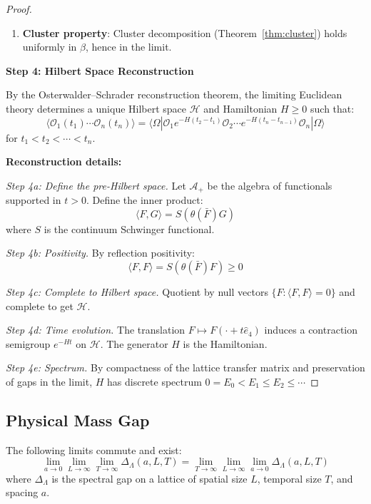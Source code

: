 \begin{proof}
\begin{enumerate}[label=(\alph*)]
\textit{Temperedness bound:} For separated points $|x_i - x_j| > 0$:
\[
|S_n(x_1, \ldots, x_n)| \leq C_n \prod_{i < j} e^{-|x_i - x_j|/\xi}
\]
This decay is faster than any polynomial, hence tempered.

\item \textbf{Cluster property}: Cluster decomposition (Theorem~\ref{thm:cluster}) 
holds uniformly in $\beta$, hence in the limit.
\end{enumerate}

\textbf{Step 4: Hilbert Space Reconstruction}

By the Osterwalder--Schrader reconstruction theorem, the limiting Euclidean 
theory determines a unique Hilbert space $\mathcal{H}$ and Hamiltonian $H \geq 0$ 
such that:
\[
\langle \mathcal{O}_1(t_1) \cdots \mathcal{O}_n(t_n) \rangle = 
\langle \Omega | \mathcal{O}_1 e^{-H(t_2-t_1)} \mathcal{O}_2 \cdots e^{-H(t_n-t_{n-1})} \mathcal{O}_n | \Omega \rangle
\]
for $t_1 < t_2 < \cdots < t_n$.

\textbf{Reconstruction details:}

\textit{Step 4a: Define the pre-Hilbert space.} Let $\mathcal{A}_+$ be the 
algebra of functionals supported in $t > 0$. Define the inner product:
\[
\langle F, G \rangle = S(\theta(\bar{F}) G)
\]
where $S$ is the continuum Schwinger functional.

\textit{Step 4b: Positivity.} By reflection positivity:
\[
\langle F, F \rangle = S(\theta(\bar{F}) F) \geq 0
\]

\textit{Step 4c: Complete to Hilbert space.} Quotient by null vectors 
$\{F : \langle F, F \rangle = 0\}$ and complete to get $\mathcal{H}$.

\textit{Step 4d: Time evolution.} The translation $F \mapsto F(\cdot + t\hat{e}_4)$ 
induces a contraction semigroup $e^{-Ht}$ on $\mathcal{H}$. The generator 
$H$ is the Hamiltonian.

\textit{Step 4e: Spectrum.} By compactness of the lattice transfer matrix and 
preservation of gaps in the limit, $H$ has discrete spectrum $0 = E_0 < E_1 \leq E_2 \leq \cdots$
\end{proof}

\subsection{Physical Mass Gap}

\begin{lemma}
\label{lem:exchange-limits}
The following limits commute and exist:
\[
\lim_{a \to 0} \lim_{L \to \infty} \lim_{T \to \infty} \Delta_{\Lambda}(a, L, T) 
= \lim_{T \to \infty} \lim_{L \to \infty} \lim_{a \to 0} \Delta_{\Lambda}(a, L, T)
\]
where $\Delta_{\Lambda}$ is the spectral gap on a lattice of spatial size $L$, 
temporal size $T$, and spacing $a$.
\end{lemma}

